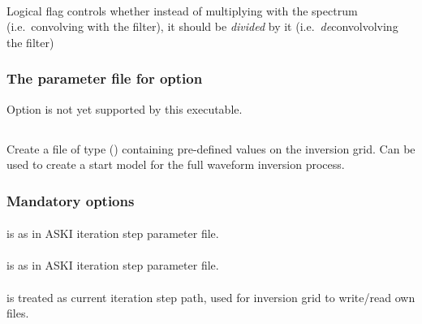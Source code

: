 \textbf{}\\
Logical flag  controls whether instead of multiplying with the spectrum (i.e.\ 
convolving with the filter), it should be \emph{divided} by it (i.e.\ \emph{de}convolvolving the filter)



\subsubsection{The parameter file for option }
Option  is not yet supported by this executable.

%
\subsection{} \label{programs_scripts,sec:bin_prog,sec:create_startmod_kim}
 Create a file of type  () containing pre-defined values on the inversion grid. Can be used to create a start model for the full waveform inversion process.

\subsubsection{Mandatory options}
\paragraph{}
 is  as in ASKI iteration step parameter file.
\paragraph{}
 is  as in ASKI iteration step parameter file.
\paragraph{}
 is treated as current iteration step path, used for inversion grid to write/read own files.

